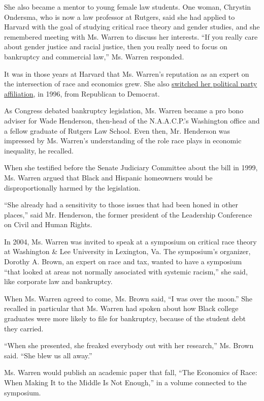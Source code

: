 She also became a mentor to young female law students. One woman,
Chrystin Ondersma, who is now a law professor at Rutgers, said she had
applied to Harvard with the goal of studying critical race theory and
gender studies, and she remembered meeting with Ms. Warren to discuss
her interests. ``If you really care about gender justice and racial
justice, then you really need to focus on bankruptcy and commercial
law,'' Ms. Warren responded.

It was in those years at Harvard that Ms. Warren's reputation as an
expert on the intersection of race and economics grew. She also
\href{https://www.nytimes.com/2019/08/25/us/politics/elizabeth-warren-republican-history.html}{switched
her political party affiliation}, in 1996, from Republican to Democrat.

As Congress debated bankruptcy legislation, Ms. Warren became a pro bono
adviser for Wade Henderson, then-head of the N.A.A.C.P.'s Washington
office and a fellow graduate of Rutgers Law School. Even then, Mr.
Henderson was impressed by Ms. Warren's understanding of the role race
plays in economic inequality, he recalled.

When she testified before the Senate Judiciary Committee about the bill
in 1999, Ms. Warren argued that Black and Hispanic homeowners would be
disproportionally harmed by the legislation.

``She already had a sensitivity to those issues that had been honed in
other places,'' said Mr. Henderson, the former president of the
Leadership Conference on Civil and Human Rights.

In 2004, Ms. Warren was invited to speak at a symposium on critical race
theory at Washington \& Lee University in Lexington, Va. The symposium's
organizer, Dorothy A. Brown, an expert on race and tax, wanted to have a
symposium ``that looked at areas not normally associated with systemic
racism,'' she said, like corporate law and bankruptcy.

When Ms. Warren agreed to come, Ms. Brown said, ``I was over the moon.''
She recalled in particular that Ms. Warren had spoken about how Black
college graduates were more likely to file for bankruptcy, because of
the student debt they carried.

``When she presented, she freaked everybody out with her research,'' Ms.
Brown said. ``She blew us all away.''

Ms. Warren would publish an academic paper that fall, ``The Economics of
Race: When Making It to the Middle Is Not Enough,'' in a volume
connected to the symposium.

